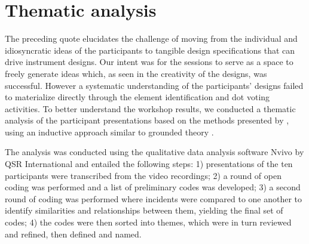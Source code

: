 \documentclass[letterpaper, 12pt]{article}
\begin{document}
\section{Thematic analysis}
\label{sec:thematic-analysis}

The preceding quote elucidates the challenge of moving from the individual and idiosyncratic ideas of the participants to tangible design specifications that can drive instrument designs. Our intent was for the sessions to serve as a space to freely generate ideas which, as seen in the creativity of the designs, was successful. However a systematic understanding of the participants' designs failed to materialize directly through the element identification and dot voting activities. 
To better understand the workshop results, we conducted a thematic analysis of the participant presentations based on the methods presented by \citet{Braun2006}, using an inductive approach similar to grounded theory \citep{Strauss1994}. 

The analysis was conducted using the qualitative data analysis software Nvivo by QSR International and entailed the following steps: 1) presentations of the ten participants were transcribed from the video recordings; 2) a round of open coding was performed and a list of preliminary codes was developed; 3) a second round of coding was performed where incidents were compared to one another to identify similarities and relationships between them, yielding the final set of codes; 4) the codes were then sorted into themes, which were in turn reviewed and refined, then defined and named.
\end{document}
